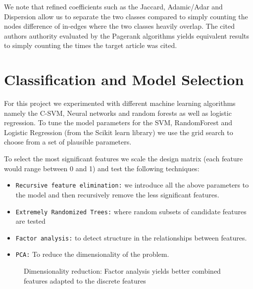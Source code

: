 \documentclass{acmsiggraph}
\newcommand{\G}{\mathbf{G}}
\newcommand{\Gac}{\mathbf{GAC}}
\begin{document}
We note that refined coefficients such as the Jaccard, Adamic/Adar and Dispersion allow us to separate the two classes compared to simply counting the nodes difference of in-edges where the two classes heavily overlap. The cited authors authority evaluated by the Pagerank algorithms yields equivalent results to simply counting the times the target article was cited.
\section{Classification and Model Selection}
For this project we experimented with different machine learning algorithms namely the C-SVM, Neural networks and random forests as well as logistic regression. To tune the model parameters for the SVM, RandomForest and Logistic Regression (from the Scikit learn library) we use the grid search to choose from a set of plausible parameters.

To select the most significant features we scale the design matrix (each feature would range between 0 and 1) and test the following techniques:
\begin{itemize}
\item \texttt{Recursive feature elimination:} we introduce all the above parameters to the model and then recursively remove the less significant features.
\item \texttt{Extremely Randomized Trees:} where random subsets of candidate features are tested
\item \texttt{Factor analysis:} to detect structure in the relationships between features.
\item \texttt{PCA:} To reduce the dimensionality of the problem.
\end{itemize}


\begin{figure}[H]
\centering
{}
\caption{Dimensionality reduction: Factor analysis yields better combined features adapted to the discrete features}
\end{figure}
\end{document}
